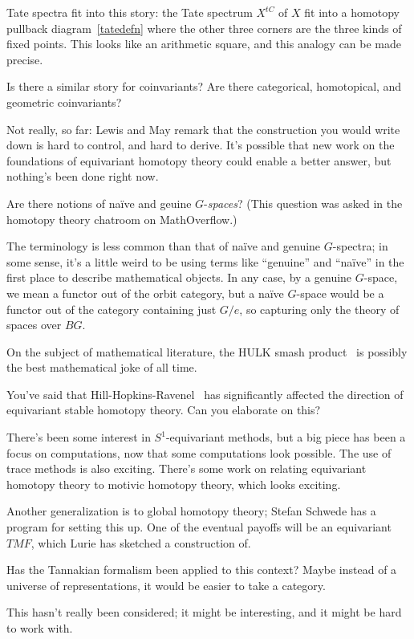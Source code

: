 Tate spectra fit into this story: the Tate spectrum $X^{tC}$ of $X$ fit into a homotopy pullback
diagram~\eqref{tatedefn} where the other three corners are the three kinds of fixed points. This looks like an
arithmetic square, and this analogy can be made precise.
\begin{ques}
Is there a similar story for coinvariants? Are there categorical, homotopical, and geometric coinvariants?
\end{ques}
Not really, so far: Lewis and May remark that the construction you would write down is hard to control, and hard to
derive. It's possible that new work on the foundations of equivariant homotopy theory could enable a better answer,
but nothing's been done right now.
\begin{ques}
Are there notions of naïve and geuine $G$-\emph{spaces}? (This question was asked in the homotopy theory chatroom
on MathOverflow.)
\end{ques}
The terminology is less common than that of naïve and genuine $G$-spectra; in some sense, it's a little weird to
be using terms like ``genuine'' and ``naïve'' in the first place to describe mathematical objects. In any case, by
a genuine $G$-space, we mean a functor out of the orbit category, but a naïve $G$-space would be a functor out of
the category containing just $G/e$, so capturing only the theory of spaces over $BG$.

On the subject of mathematical literature, the HULK smash product~\cite{HulkSmash} is possibly the best
mathematical joke of all time.
\begin{ques}
You've said that Hill-Hopkins-Ravenel~\cite{HHR} has significantly affected the direction of equivariant stable
homotopy theory. Can you elaborate on this?
\end{ques}
There's been some interest in $S^1$-equivariant methods, but a big piece has been a focus on computations, now that
some computations look possible. The use of trace methods is also exciting. There's some work on relating
equivariant homotopy theory to motivic homotopy theory, which looks exciting.

Another generalization is to global homotopy theory; Stefan Schwede has a program for setting this up. One of the
eventual payoffs will be an equivariant $\mathit{TMF}$, which Lurie has sketched a construction of.
\begin{ques}
Has the Tannakian formalism been applied to this context? Maybe instead of a universe of representations, it would
be easier to take a category.
\end{ques}
This hasn't really been considered; it might be interesting, and it might be hard to work with.

